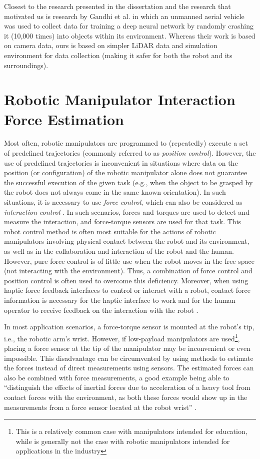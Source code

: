 Closest to the research presented in the dissertation and the research that motivated us is research by Gandhi et al. \cite{Gandhi2017} in which an unmanned aerial vehicle was used to collect data for training a deep neural network by randomly crashing it (10,000 times) into objects within its environment. Whereas their work is based on camera data, ours is based on simpler LiDAR data and simulation environment for data collection (making it safer for both the robot and its surroundings).

\section{Robotic Manipulator Interaction Force Estimation}

Most often, robotic manipulators are programmed to (repeatedly) execute a set of predefined trajectories (commonly referred to as \emph{position control}).  However, the use of predefined trajectories is inconvenient in situations where data on the position (or configuration) of the robotic manipulator alone does not guarantee the successful execution of the given task (e.g., when the object to be grasped by the robot does not always come in the same known orientation). In such situations, it is necessary to use \emph{force control}, which can also be considered as \emph{interaction control} \cite{Siciliano1999}. In such scenarios, forces and torques are used to detect and measure the interaction, and force-torque sensors are used for that task. This robot control method is often most suitable for the actions of robotic manipulators involving physical contact between the robot and its environment, as well as in the collaboration and interaction of the robot and the human. However, pure force control is of little use when the robot moves in the free space (not interacting with the environment). Thus, a combination of force control and position control is often used to overcome this deficiency. Moreover, when using haptic force feedback interfaces to control or interact with a robot, contact force information is necessary for the haptic interface to work and for the human operator to receive feedback on the interaction with the robot \cite{Song2019}.

In most application scenarios, a force-torque sensor is mounted at the robot's tip, i.e., the robotic arm's wrist. However, if low-payload manipulators are used\footnote{This is a relatively common case with manipulators intended for education, while is generally not the case with robotic manipulators intended for applications in the industry}, placing a force sensor at the tip of the manipulator may be inconvenient or even impossible. This disadvantage can be circumvented by using methods to estimate the forces instead of direct measurements using sensors. The estimated forces can also be combined with force measurements, a good example being able to ``distinguish the effects of inertial forces due to acceleration of a heavy tool from contact forces with the environment, as both these forces would show up in the measurements from a force sensor located at the robot wrist'' \cite{Alcocer2003}.

